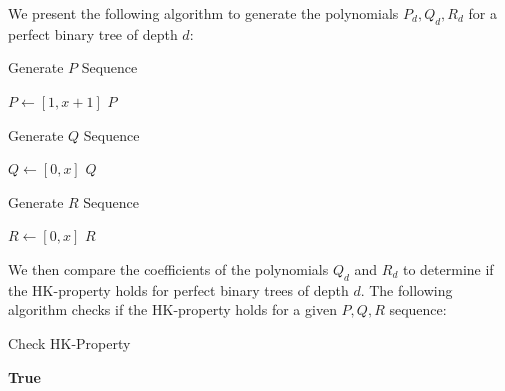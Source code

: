 \documentclass{amsart}
\theoremstyle{definition}
\begin{document}
\begin{appendix}
	We present the following algorithm to generate the polynomials $P_d, Q_d, R_d$ for a perfect binary tree of depth $d$:

	\begin{algorithm}[H]
		\caption{Generate $P$ Sequence}
		$P \gets [1, x+1]$\;
		\Return $P$
	\end{algorithm}

	\begin{algorithm}[H]
		\caption{Generate $Q$ Sequence}
		$Q \gets [0, x]$\;
		\Return $Q$
	\end{algorithm}

	\begin{algorithm}[H]
		\caption{Generate $R$ Sequence}
		$R \gets [0, x]$\;
		\Return $R$
	\end{algorithm}

	\vspace{1cm}
	We then compare the coefficients of the polynomials $Q_d$ and $R_d$ to determine if the HK-property holds for perfect binary trees of depth $d$. The following algorithm checks if the HK-property holds for a given $P, Q, R$ sequence:
	\newline

	\begin{algorithm}[H]
		\caption{Check HK-Property}
		\Return \textbf{True}
	\end{algorithm}

\end{appendix}

\newpage





\end{document}
